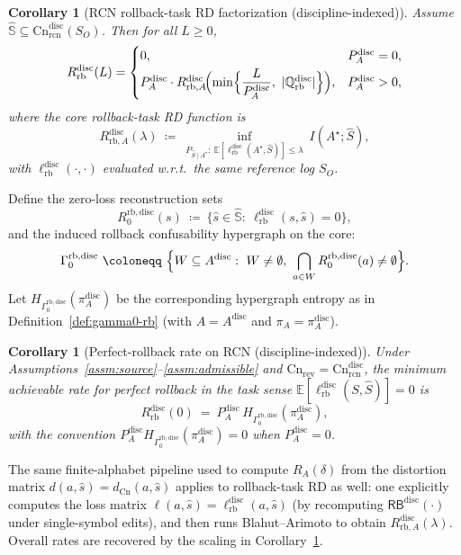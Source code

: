 \documentclass[twoside]{article}
\newtheorem{corollary}[theorem]{Corollary}
\newcommand{\Cn}{\mathrm{Cn}}
\newcommand{\E}{\mathbb{E}}
\newcommand{\1}{\mathbf{1}}
\begin{document}
\begin{corollary}[RCN rollback-task RD factorization (discipline-indexed)]
\label{cor:rcn-Rrb-factorization}
Assume \(\hat{\mathbb{S}}\subseteq \Cn^{\mathrm{disc}}_{\mathrm{rcn}}(S_O)\).
Then for all \(L\ge 0\),
\[
R^{\mathrm{disc}}_{\mathrm{rb}}(L)=
\begin{cases}
0, & P_A^{\mathrm{disc}}=0,\\[1mm]
P_A^{\mathrm{disc}}\cdot R^{\mathrm{disc}}_{\mathrm{rb},A}\!\Bigl(\min\Bigl\{\dfrac{L}{P_A^{\mathrm{disc}}},\ |\mathbb{Q}^{\mathrm{disc}}_{\mathrm{rb}}|\Bigr\}\Bigr),
& P_A^{\mathrm{disc}}>0,
\end{cases}
\]
where the \emph{core rollback-task RD function} is
\[
R^{\mathrm{disc}}_{\mathrm{rb},A}(\lambda)
\ \coloneqq\
\inf_{P_{\hat S\mid A^\star}:\ \E[\ell^{\mathrm{disc}}_{\mathrm{rb}}(A^\star,\hat S)]\le \lambda}\ I(A^\star;\hat S),
\]
with \(\ell^{\mathrm{disc}}_{\mathrm{rb}}(\cdot,\cdot)\) evaluated w.r.t.\ the same reference log \(S_O\).
\end{corollary}

Define the zero-loss reconstruction sets
\[
R^{\mathrm{rb},\mathrm{disc}}_0(s)\ \coloneqq\ \{\hat s\in\hat{\mathbb{S}}:\ \ell^{\mathrm{disc}}_{\mathrm{rb}}(s,\hat s)=0\},
\]
and the induced rollback confusability hypergraph on the core:
\[
\Gamma^{\mathrm{rb},\mathrm{disc}}_0
\ \coloneqq\
\Bigl\{W\subseteq A^{\mathrm{disc}}:\ W\neq\emptyset,\ \bigcap_{a\in W}R^{\mathrm{rb},\mathrm{disc}}_0(a)\neq\emptyset\Bigr\}.
\]
Let \(H_{\Gamma^{\mathrm{rb},\mathrm{disc}}_0}(\pi_A^{\mathrm{disc}})\) be the corresponding hypergraph entropy
as in Definition~\ref{def:gamma0-rb} (with \(A=A^{\mathrm{disc}}\) and \(\pi_A=\pi_A^{\mathrm{disc}}\)).

\begin{corollary}[Perfect-rollback rate on RCN (discipline-indexed)]
\label{cor:rcn-perfect-rollback-hypergraph}
Under Assumptions~\ref{assm:source}--\ref{assm:admissible} and \(\Cn_{\mathrm{rev}}=\Cn^{\mathrm{disc}}_{\mathrm{rcn}}\),
the minimum achievable rate for perfect rollback in the task sense \(\E[\ell^{\mathrm{disc}}_{\mathrm{rb}}(S,\hat S)]=0\) is
\[
R^{\mathrm{disc}}_{\mathrm{rb}}(0)\ =\ P_A^{\mathrm{disc}}\,H_{\Gamma^{\mathrm{rb},\mathrm{disc}}_0}(\pi_A^{\mathrm{disc}}),
\]
with the convention \(P_A^{\mathrm{disc}}H_{\Gamma^{\mathrm{rb},\mathrm{disc}}_0}(\pi_A^{\mathrm{disc}})=0\) when \(P_A^{\mathrm{disc}}=0\).
\end{corollary}

The same finite-alphabet pipeline used to compute \(R_A(\delta)\) from the distortion matrix
\(d(a,\hat s)=d_{\Cn}(a,\hat s)\) applies to rollback-task RD as well:
one explicitly computes the loss matrix \(\ell(a,\hat s)=\ell^{\mathrm{disc}}_{\mathrm{rb}}(a,\hat s)\)
(by recomputing \(\mathsf{RB}^{\mathrm{disc}}(\cdot)\) under single-symbol edits), and then runs Blahut--Arimoto
to obtain \(R^{\mathrm{disc}}_{\mathrm{rb},A}(\lambda)\).
Overall rates are recovered by the scaling in Corollary~\ref{cor:rcn-Rrb-factorization}.
\end{document}
